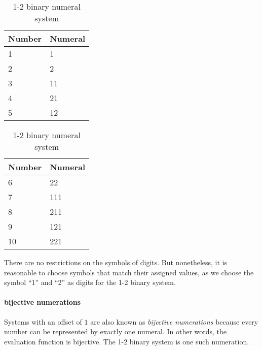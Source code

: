 \documentclass[\main/thesis.tex]{subfiles}
\begin{document}
\begin{table}[H]
    \centering
    \begin{adjustbox}{max width=\textwidth}
    \begin{tabular}{ | l | l |}
    \textbf{Number} & \textbf{Numeral} \\
    \hline
    1 & 1  \\
    2 & 2  \\
    3 & 11 \\
    4 & 21 \\
    5 & 12 \\
    \end{tabular}
    \quad
    \begin{tabular}{ | l | l | }
    \textbf{Number} & \textbf{Numeral} \\
    \hline
    6  & 22 \\
    7  & 111 \\
    8  & 211 \\
    9  & 121 \\
    10 & 221 \\
    \end{tabular}
    \end{adjustbox}
\caption{1-2 binary numeral system}
\label{table:8}
\end{table}

There are no restrictions on the symbols of digits.
But nonetheless, it is reasonable to choose symbols that match their assigned
values, as we choose the symbol ``1'' and ``2'' as digits for the 1-2 binary system.


\paragraph{bijective numerations}
Systems with an offset of $ 1 $ are also known as \textit{bijective numerations}
because every number can be represented by exactly one numeral. In other words,
the evaluation function is bijective. The 1-2 binary system is one such numeration.
\end{document}
